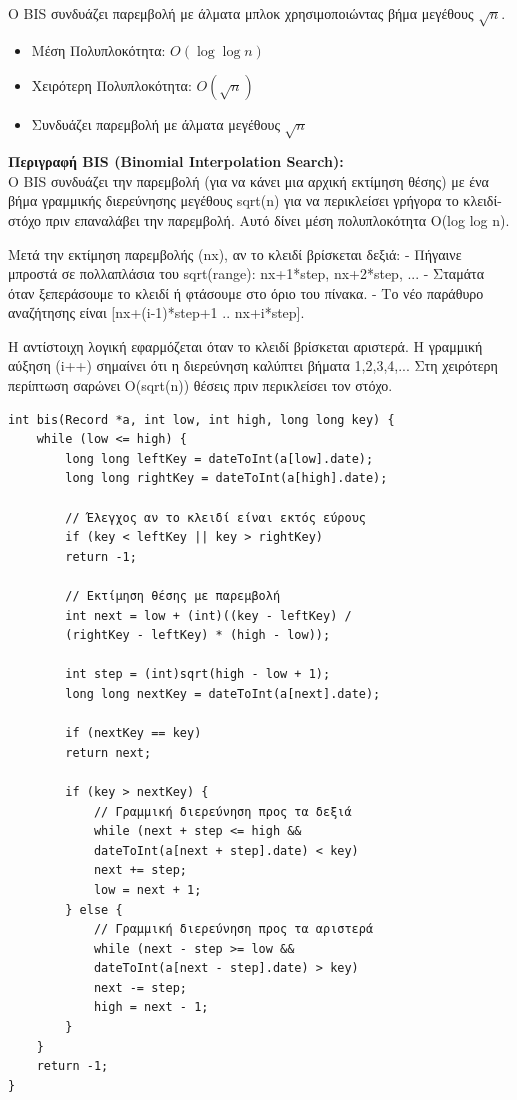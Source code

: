 \documentclass[a4paper,12pt]{article}
\begin{document}
	Ο BIS συνδυάζει παρεμβολή με άλματα μπλοκ χρησιμοποιώντας βήμα μεγέθους $\sqrt{n}$.
	
	\begin{itemize}
		\item Μέση Πολυπλοκότητα: $O(\log \log n)$
		\item Χειρότερη Πολυπλοκότητα: $O(\sqrt{n})$
		\item Συνδυάζει παρεμβολή με άλματα μεγέθους $\sqrt{n}$
	\end{itemize}
	
	\textbf{Περιγραφή BIS (Binomial Interpolation Search):}\\
	Ο BIS συνδυάζει την παρεμβολή (για να κάνει μια αρχική εκτίμηση θέσης) με ένα βήμα γραμμικής διερεύνησης μεγέθους sqrt(n) για να περικλείσει γρήγορα το κλειδί-στόχο πριν επαναλάβει την παρεμβολή. Αυτό δίνει μέση πολυπλοκότητα O(log log n).
	
	Μετά την εκτίμηση παρεμβολής (nx), αν το κλειδί βρίσκεται δεξιά:
	- Πήγαινε μπροστά σε πολλαπλάσια του sqrt(range): nx+1*step, nx+2*step, ...
	- Σταμάτα όταν ξεπεράσουμε το κλειδί ή φτάσουμε στο όριο του πίνακα.
	- Το νέο παράθυρο αναζήτησης είναι [nx+(i-1)*step+1 .. nx+i*step].
	
	Η αντίστοιχη λογική εφαρμόζεται όταν το κλειδί βρίσκεται αριστερά. Η γραμμική αύξηση (i++) σημαίνει ότι η διερεύνηση καλύπτει βήματα 1,2,3,4,... Στη χειρότερη περίπτωση σαρώνει O(sqrt(n)) θέσεις πριν περικλείσει τον στόχο.
	
	\begin{lstlisting}[caption=Υλοποίηση BIS]
int bis(Record *a, int low, int high, long long key) {
	while (low <= high) {
		long long leftKey = dateToInt(a[low].date);
		long long rightKey = dateToInt(a[high].date);
		
		// Έλεγχος αν το κλειδί είναι εκτός εύρους
		if (key < leftKey || key > rightKey)
		return -1;
		
		// Εκτίμηση θέσης με παρεμβολή
		int next = low + (int)((key - leftKey) / 
		(rightKey - leftKey) * (high - low));
		
		int step = (int)sqrt(high - low + 1);
		long long nextKey = dateToInt(a[next].date);
		
		if (nextKey == key)
		return next;
		
		if (key > nextKey) {
			// Γραμμική διερεύνηση προς τα δεξιά
			while (next + step <= high && 
			dateToInt(a[next + step].date) < key)
			next += step;
			low = next + 1;
		} else {
			// Γραμμική διερεύνηση προς τα αριστερά
			while (next - step >= low && 
			dateToInt(a[next - step].date) > key)
			next -= step;
			high = next - 1;
		}
	}
	return -1;
}
	\end{lstlisting}
	
\end{document}

